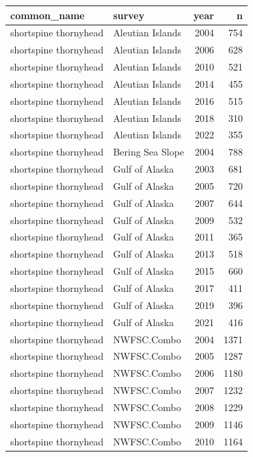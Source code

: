 \documentclass[
  letterpaper,
  DIV=11,
  numbers=noendperiod]{scrartcl}
\begin{document}
\begin{tabular}[t]{l|l|r|r}
\hline
common\_name & survey & year & n\\
\hline
shortspine thornyhead & Aleutian Islands & 2004 & 754\\
\hline
shortspine thornyhead & Aleutian Islands & 2006 & 628\\
\hline
shortspine thornyhead & Aleutian Islands & 2010 & 521\\
\hline
shortspine thornyhead & Aleutian Islands & 2014 & 455\\
\hline
shortspine thornyhead & Aleutian Islands & 2016 & 515\\
\hline
shortspine thornyhead & Aleutian Islands & 2018 & 310\\
\hline
shortspine thornyhead & Aleutian Islands & 2022 & 355\\
\hline
shortspine thornyhead & Bering Sea Slope & 2004 & 788\\
\hline
shortspine thornyhead & Gulf of Alaska & 2003 & 681\\
\hline
shortspine thornyhead & Gulf of Alaska & 2005 & 720\\
\hline
shortspine thornyhead & Gulf of Alaska & 2007 & 644\\
\hline
shortspine thornyhead & Gulf of Alaska & 2009 & 532\\
\hline
shortspine thornyhead & Gulf of Alaska & 2011 & 365\\
\hline
shortspine thornyhead & Gulf of Alaska & 2013 & 518\\
\hline
shortspine thornyhead & Gulf of Alaska & 2015 & 660\\
\hline
shortspine thornyhead & Gulf of Alaska & 2017 & 411\\
\hline
shortspine thornyhead & Gulf of Alaska & 2019 & 396\\
\hline
shortspine thornyhead & Gulf of Alaska & 2021 & 416\\
\hline
shortspine thornyhead & NWFSC.Combo & 2004 & 1371\\
\hline
shortspine thornyhead & NWFSC.Combo & 2005 & 1287\\
\hline
shortspine thornyhead & NWFSC.Combo & 2006 & 1180\\
\hline
shortspine thornyhead & NWFSC.Combo & 2007 & 1232\\
\hline
shortspine thornyhead & NWFSC.Combo & 2008 & 1229\\
\hline
shortspine thornyhead & NWFSC.Combo & 2009 & 1146\\
\hline
shortspine thornyhead & NWFSC.Combo & 2010 & 1164\\

\end{tabular}
\end{document}
